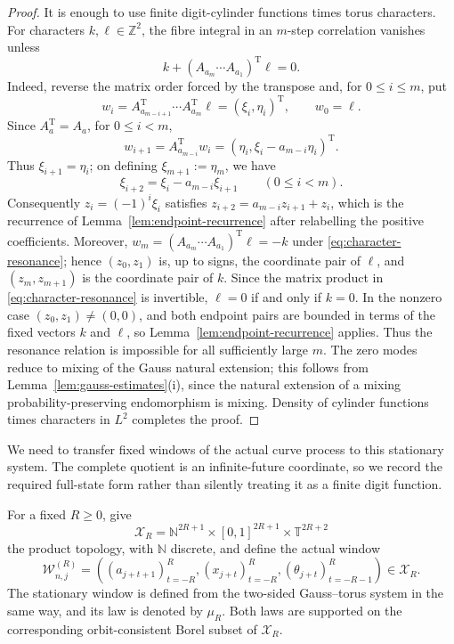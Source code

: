 \documentclass[11pt,a4paper]{amsart}
\theoremstyle{definition}
\theoremstyle{remark}
\newcommand{\T}{\mathbb T}
\newcommand{\N}{\mathbb N}
\newcommand{\Z}{\mathbb Z}
\begin{document}
\begin{proof}
It is enough to use finite digit-cylinder functions times torus characters.
For characters $k,\ell\in\Z^2$, the fibre integral in an $m$-step
correlation vanishes unless
\begin{equation}\label{eq:character-resonance}
 k+(A_{a_m}\cdots A_{a_1})^{\mathrm T}\ell=0.
\end{equation}
Indeed, reverse the matrix order forced by the transpose and, for
$0\le i\le m$, put
\[
 w_i=A_{a_{m-i+1}}^{\mathrm T}\cdots A_{a_m}^{\mathrm T}\ell
     =(\xi_i,\eta_i)^{\mathrm T},
 \qquad w_0=\ell.
\]
Since $A_a^{\mathrm T}=A_a$, for $0\le i<m$,
\[
 w_{i+1}=A_{a_{m-i}}^{\mathrm T}w_i
          =(\eta_i,\xi_i-a_{m-i}\eta_i)^{\mathrm T}.
\]
Thus $\xi_{i+1}=\eta_i$; on defining $\xi_{m+1}:=\eta_m$, we have
\[
 \xi_{i+2}=\xi_i-a_{m-i}\xi_{i+1}
 \qquad(0\le i<m).
\]
Consequently $z_i=(-1)^i\xi_i$ satisfies
$z_{i+2}=a_{m-i}z_{i+1}+z_i$, which is the recurrence of
Lemma~\ref{lem:endpoint-recurrence} after relabelling the positive
coefficients.  Moreover,
$w_m=(A_{a_m}\cdots A_{a_1})^{\mathrm T}\ell=-k$ under
\eqref{eq:character-resonance}; hence $(z_0,z_1)$ is, up to signs, the
coordinate pair of $\ell$, and $(z_m,z_{m+1})$ is the coordinate pair of
$k$.  Since the matrix product in \eqref{eq:character-resonance} is
invertible, $\ell=0$ if and only if $k=0$.  In the nonzero case
$(z_0,z_1)\ne(0,0)$, and both endpoint pairs are bounded in terms of the
fixed vectors $k$ and $\ell$, so Lemma~\ref{lem:endpoint-recurrence} applies.
Thus the resonance relation is impossible for all sufficiently large $m$.
The zero modes reduce to mixing of the Gauss natural extension; this follows
from Lemma~\ref{lem:gauss-estimates}(i), since the natural extension of a
mixing probability-preserving endomorphism is mixing.
Density of cylinder functions times characters in $L^2$ completes the proof.
\end{proof}

We need to transfer fixed windows of the actual curve process to this
stationary system.  The complete quotient is an infinite-future coordinate,
so we record the required full-state form rather than silently treating it as
a finite digit function.

For a fixed $R\ge0$, give
\begin{equation}\label{eq:window-space}
 \mathcal X_R
 =\N^{2R+1}\times[0,1]^{2R+1}\times\T^{2R+2}
\end{equation}
the product topology, with $\N$ discrete, and define the actual window
\begin{equation}\label{eq:actual-window}
 \mathcal W_{n,j}^{(R)}=
 \left((a_{j+t+1})_{t=-R}^{R},
       (x_{j+t})_{t=-R}^{R},
       (\theta_{j+t})_{t=-R-1}^{R}\right)\in\mathcal X_R.
\end{equation}
The stationary window is defined from the two-sided Gauss--torus system in
the same way, and its law is denoted by $\mu_R$.  Both laws are supported on
the corresponding orbit-consistent Borel subset of $\mathcal X_R$.
\end{document}
